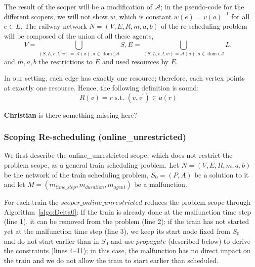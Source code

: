 \documentclass{article}
\DeclareMathOperator{\dom}{dom}
\begin{document}
The result of the scoper will be a modification of $\mathcal{A}$;
in the pseudo-code for the different scopers, we will not show $w$, which is constant $w(e)= {v(a)}^{-1}$ for all $e \in L$. The railway network  $N=(V,E,R,m,a,b)$ of the re-scheduling problem will be composed of the union of all these agents,
\begin{equation}
V=\bigcup_{(S,L,e,l,w)=\mathcal{A}(a), a \in \dom(\mathcal{A}}S, E=\bigcup_{(S,L,e,l,w)=\mathcal{A}(a), a \in \dom(\mathcal{A}}L,
\end{equation}
and $m,a,b$ the restrictions to $E$ and used resources by $E$.


In our setting, each edge has exactly one resource; therefore, each vertex points at exactly one resource. Hence, the following definition is sound:
\begin{equation}
    R(v) = r \textrm{ s.t. } (v,v^\prime) \in a(r)
\end{equation}


\begin{mdframed}
{\bf Christian} is there something missing here?
\end{mdframed}

\subsubsection{Scoping Re-scheduling (online\_unrestricted)} \label{subsubsec:scope_online_unrestricted}

We first describe the online\_unrestricted scope, which does not restrict the problem scope, as a general train scheduling problem. Let $N=(V,E,R,m,a,b)$ be the network of the train scheduling problem, $S_0=(P,A)$ be a solution to it and let $M=(m_{time\_step},m_{duration},m_{agent})$ be a malfunction.

For each train the $scoper\_online\_unrestricted$ reduces the problem scope through Algorithm~\ref{algo:Delta0}:
If the train is already done at the malfunction time step (line 1), it can be removed from the problem (line 2);
if the train has not started yet at the malfunction time step (line 3), we keep its start node fixed from $S_0$ and do not start earlier than in $S_0$ and use $propagate$ (described below) to derive the constraints (lines 4--11); in this case, the malfunction has no direct impact on the train and we do not allow the train to start earlier than scheduled.
\end{document}
